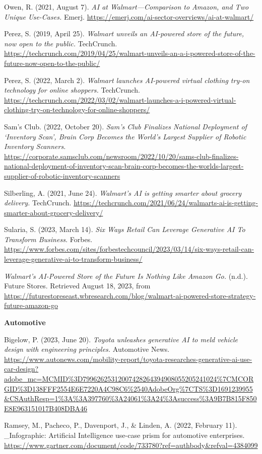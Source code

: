 \documentclass[
]{article}
\begin{document}
Owen, R. (2021, August 7). \emph{AI at Walmart---Comparison to Amazon, and Two Unique Use-Cases.} Emerj. \url{https://emerj.com/ai-sector-overviews/ai-at-walmart/}

Perez, S. (2019, April 25). \emph{Walmart unveils an AI-powered store of the future, now open to the public.} TechCrunch. \url{https://techcrunch.com/2019/04/25/walmart-unveils-an-a-i-powered-store-of-the-future-now-open-to-the-public/}

Perez, S. (2022, March 2). \emph{Walmart launches AI-powered virtual clothing try-on technology for online shoppers.} TechCrunch. \url{https://techcrunch.com/2022/03/02/walmart-launches-a-i-powered-virtual-clothing-try-on-technology-for-online-shoppers/}

Sam's Club. (2022, October 20). \emph{Sam's Club Finalizes National Deployment of `Inventory Scan', Brain Corp Becomes the World's Largest Supplier of Robotic Inventory Scanners.} \url{https://corporate.samsclub.com/newsroom/2022/10/20/sams-club-finalizes-national-deployment-of-inventory-scan-brain-corp-becomes-the-worlds-largest-supplier-of-robotic-inventory-scanners}

Silberling, A. (2021, June 24). \emph{Walmart's AI is getting smarter about grocery delivery.} TechCrunch. \url{https://techcrunch.com/2021/06/24/walmarts-ai-is-getting-smarter-about-grocery-delivery/}

Sularia, S. (2023, March 14). \emph{Six Ways Retail Can Leverage Generative AI To Transform Business.} Forbes. \url{https://www.forbes.com/sites/forbestechcouncil/2023/03/14/six-ways-retail-can-leverage-generative-ai-to-transform-business/}

\emph{Walmart's AI-Powered Store of the Future Is Nothing Like Amazon Go.} (n.d.). Future Stores. Retrieved August 18, 2023, from \url{https://futurestoreseast.wbresearch.com/blog/walmart-ai-powered-store-strategy-future-amazon-go}

\textbf{Automotive}

Bigelow, P. (2023, June 20). \emph{Toyota unleashes generative AI to meld vehicle design with engineering principles.} Automotive News. \url{https://www.autonews.com/mobility-report/toyota-researches-generative-ai-use-car-design?adobe_mc=MCMID\%3D79962625312007428264394908055205241024\%7CMCORGID\%3D138FFF2554E6E7220A4C98C6\%2540AdobeOrg\%7CTS\%3D1691239955\&CSAuthResp=1\%3A\%3A397760\%3A24061\%3A24\%3Asuccess\%3A9B7B815F850E8E963151017B408DBA46}

Ramsey, M., Pacheco, P., Davenport, J., \& Linden, A. (2022, February 11). \_Infographic: Artificial Intelligence use-case prism for automotive enterprises.
\url{https://www.gartner.com/document/code/733780?ref=authbody\&refval=4384099}
\end{document}
